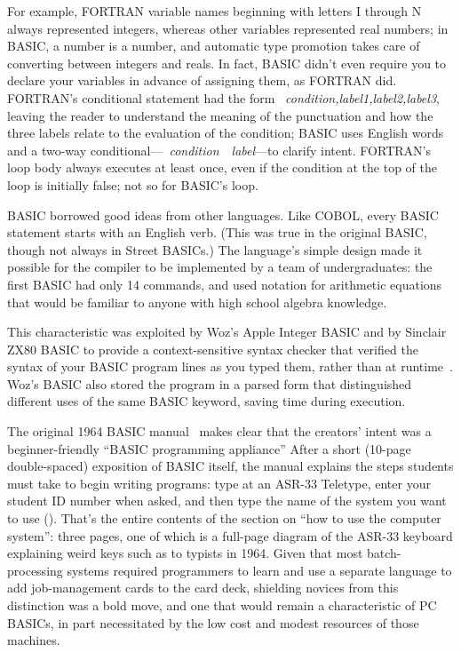\documentclass{article}
\begin{document}
For example, FORTRAN variable names beginning with letters I
through N always represented integers, whereas other variables represented
real numbers; in BASIC, a number is a number, and automatic type
promotion takes care of converting between integers and reals.  In
fact, BASIC didn't even require you to declare your variables in
advance of assigning them, as FORTRAN did.  FORTRAN's
conditional statement had the form 
~\emph{condition,label1,label2,label3}, leaving the reader to
understand the meaning of the punctuation and how the three labels
relate to the evaluation of the condition; BASIC uses English
words and a two-way
conditional---~\emph{condition}~~\emph{label}---to
clarify intent.  FORTRAN's  loop body always executes at least once,
even if the condition at the top of the loop is initially false; not
so for BASIC's  loop.

BASIC borrowed good ideas from other languages.  Like COBOL, every BASIC
statement starts with an English verb.  (This was true in the original
BASIC, though not always in Street BASICs.)  The language's simple
design made it possible for the compiler to be implemented by a team of
undergraduates: the first BASIC had only 14 commands, and used notation
for arithmetic 
equations that would be familiar to anyone with high school algebra knowledge.


  \begin{geeknote}
   This characteristic was exploited by Woz's Apple Integer BASIC and by
   Sinclair ZX80 BASIC to 
    provide a context-sensitive syntax checker that verified the syntax
    of your BASIC program lines as you typed them, rather than at
    runtime~\cite{zx80_basic_techreport}.  Woz's BASIC also stored the
    program in a parsed form that distinguished different uses of the
    same BASIC keyword, saving time during execution.
  \end{geeknote}

The original 1964 BASIC manual~\cite[p. 14]{dartmouth_basic_manual}
makes clear that the
creators' intent was a beginner-friendly ``BASIC programming appliance'' 
After a short (10-page double-spaced) exposition of BASIC itself, the
manual explains the steps students must take to begin writing programs: 
type  at an ASR-33
Teletype, enter your student ID number when asked, 
and then type the name of the system you want to use ().
That's the entire contents of the section on ``how to use the computer
system'': three pages, one of which is a full-page diagram of the ASR-33
keyboard 
explaining weird keys such as  to typists in 1964.
Given that most batch-processing systems required programmers to
learn and use a 
separate  language to add 
job-management cards to the card deck, shielding novices from this
distinction was a bold move, and one that would remain a characteristic of
PC BASICs, in part necessitated by the low cost and
modest resources of those machines.
\end{document}
